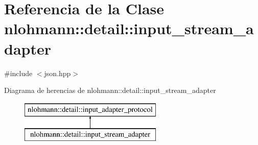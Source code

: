 \hypertarget{classnlohmann_1_1detail_1_1input__stream__adapter}{}\section{Referencia de la Clase nlohmann\+:\+:detail\+:\+:input\+\_\+stream\+\_\+adapter}
\label{classnlohmann_1_1detail_1_1input__stream__adapter}


{\ttfamily \#include $<$json.\+hpp$>$}

Diagrama de herencias de nlohmann\+:\+:detail\+:\+:input\+\_\+stream\+\_\+adapter\begin{figure}[H]
\begin{center}
\leavevmode
\includegraphics[height=2.000000cm]{classnlohmann_1_1detail_1_1input__stream__adapter}
\end{center}
\end{figure}
